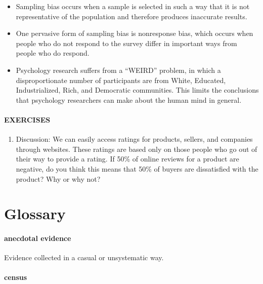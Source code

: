 \documentclass[
]{krantz}
\providecommand{\tightlist}{%
  \setlength{\itemsep}{0pt}\setlength{\parskip}{0pt}}
\begin{document}
\begin{itemize}
\tightlist
\item
  Sampling bias occurs when a sample is selected in such a way that it is not representative of the population and therefore produces inaccurate results.
\item
  One pervasive form of sampling bias is nonresponse bias, which occurs when people who do not respond to the survey differ in important ways from people who do respond.
\item
  Psychology research suffers from a ``WEIRD'' problem, in which a disproportionate number of participants are from White, Educated, Industrialized, Rich, and Democratic communities. This limits the conclusions that psychology researchers can make about the human mind in general.
\end{itemize}

\paragraph*{EXERCISES}\label{exercises-11}

\begin{enumerate}
\def\labelenumi{\arabic{enumi}.}
\tightlist
\item
  Discussion: We can easily access ratings for products, sellers, and companies through websites. These ratings are based only on those people who go out of their way to provide a rating. If 50\% of online reviews for a product are negative, do you think this means that 50\% of buyers are dissatisfied with the product? Why or why not?
\end{enumerate}

\section{Glossary}\label{glossary-4}

\paragraph*{anecdotal evidence}\label{anecdotal-evidence-1}

Evidence collected in a casual or unsystematic way.

\paragraph*{census}\label{census}
\end{document}
